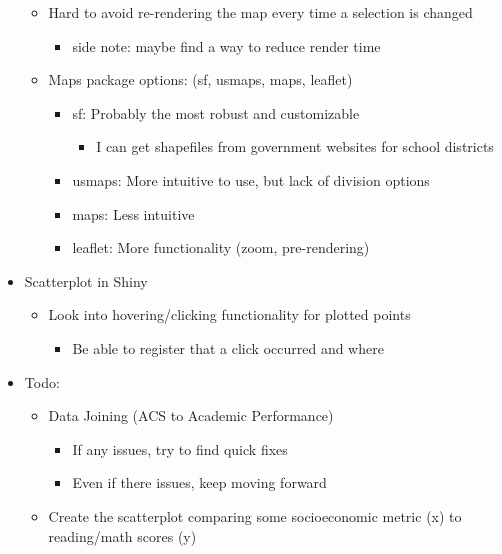 \documentclass[
  letterpaper,
  DIV=11,
  numbers=noendperiod]{scrartcl}
\providecommand{\tightlist}{%
  \setlength{\itemsep}{0pt}\setlength{\parskip}{0pt}}\usepackage{longtable,booktabs,array}
\begin{document}
\begin{itemize}
  \begin{itemize}
  \item
    Hard to avoid re-rendering the map every time a selection is changed

    \begin{itemize}
    \tightlist
    \item
      side note: maybe find a way to reduce render time
    \end{itemize}
  \item
    Maps package options: (sf, usmaps, maps, leaflet)

    \begin{itemize}
    \item
      sf: Probably the most robust and customizable

      \begin{itemize}
      \tightlist
      \item
        I can get shapefiles from government websites for school
        districts
      \end{itemize}
    \item
      usmaps: More intuitive to use, but lack of division options
    \item
      maps: Less intuitive
    \item
      leaflet: More functionality (zoom, pre-rendering)
    \end{itemize}
  \end{itemize}
\item
  Scatterplot in Shiny

  \begin{itemize}
  \item
    Look into hovering/clicking functionality for plotted points

    \begin{itemize}
    \tightlist
    \item
      Be able to register that a click occurred and where
    \end{itemize}
  \end{itemize}
\item
  Todo:

  \begin{itemize}
  \item
    Data Joining (ACS to Academic Performance)

    \begin{itemize}
    \item
      If any issues, try to find quick fixes
    \item
      Even if there issues, keep moving forward
    \end{itemize}
  \item
    Create the scatterplot comparing some socioeconomic metric (x) to
    reading/math scores (y)


\end{itemize}
\end{itemize}
\end{document}
